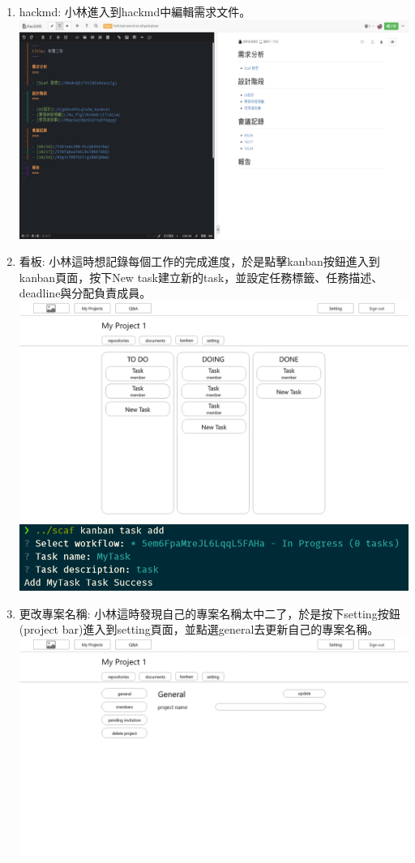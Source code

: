 \documentclass{report}
\begin{document}
\begin{enumerate}[label=(\Alph*)]
  \item hackmd: 小林進入到hackmd中編輯需求文件。\\
  \includegraphics[width=\textwidth]{assets/wireframe/hackmd.png}
  \item 看板: 小林這時想記錄每個工作的完成進度，於是點擊kanban按鈕進入到kanban頁面，按下New task建立新的task，並設定任務標籤、任務描述、deadline與分配負責成員。\\
  \includegraphics[width=\textwidth]{assets/wireframe/My_Projects_kanban.png}
  \includegraphics[width=\textwidth]{assets/wireframe/My_Projects_kanban_CLI.png}
  \item 更改專案名稱: 小林這時發現自己的專案名稱太中二了，於是按下setting按鈕(project bar)進入到setting頁面，並點選general去更新自己的專案名稱。\\
  \includegraphics[width=\textwidth]{assets/wireframe/My_Projects_setting_general.png}

\end{enumerate}
\end{document}
